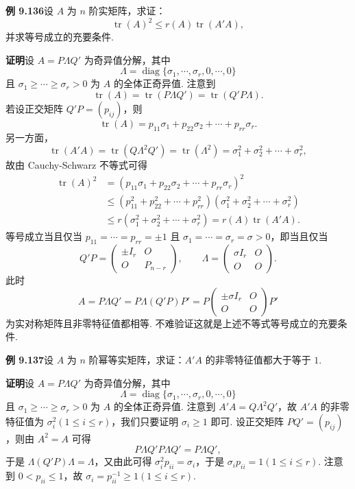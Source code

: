 \documentclass[UTF8,12pt,a4paper,fontset=fandol]{ctexart}
\begin{document}
\noindent\textbf{例 9.136}\quad 设 $A$ 为 $n$ 阶实矩阵，求证：
\[
\operatorname{tr}(A)^2\le r(A)\operatorname{tr}(A'A),
\]
并求等号成立的充要条件.

\noindent\textbf{证明}\quad 设 $A=P\Lambda Q'$ 为奇异值分解，其中
\[
\Lambda=\operatorname{diag}\{\sigma_1,\cdots,\sigma_r,0,\cdots,0\}
\]
且 $\sigma_1\ge\cdots\ge\sigma_r>0$ 为 $A$ 的全体正奇异值. 注意到
\[
\operatorname{tr}(A)=\operatorname{tr}(P\Lambda Q')=\operatorname{tr}(Q'P\Lambda).
\]
若设正交矩阵 $Q'P=(p_{ij})$，则
\[
\operatorname{tr}(A)=p_{11}\sigma_1+p_{22}\sigma_2+\cdots+p_{rr}\sigma_r.
\]
另一方面，
\[
\operatorname{tr}(A'A)=\operatorname{tr}(Q\Lambda^2Q')=\operatorname{tr}(\Lambda^2)=\sigma_1^2+\sigma_2^2+\cdots+\sigma_r^2,
\]
故由 Cauchy-Schwarz 不等式可得
\[
\begin{aligned}
\operatorname{tr}(A)^2
&=(p_{11}\sigma_1+p_{22}\sigma_2+\cdots+p_{rr}\sigma_r)^2\\
&\le(p_{11}^2+p_{22}^2+\cdots+p_{rr}^2)(\sigma_1^2+\sigma_2^2+\cdots+\sigma_r^2)\\
&\le r(\sigma_1^2+\sigma_2^2+\cdots+\sigma_r^2)=r(A)\operatorname{tr}(A'A).
\end{aligned}
\]
等号成立当且仅当 $p_{11}=\cdots=p_{rr}=\pm1$ 且 $\sigma_1=\cdots=\sigma_r=\sigma>0$，即当且仅当
\[
Q'P=\begin{pmatrix}
\pm I_r&O\\
O&P_{n-r}
\end{pmatrix},\qquad
\Lambda=\begin{pmatrix}
\sigma I_r&O\\
O&O
\end{pmatrix}.
\]
此时
\[
A=P\Lambda Q'=P\Lambda(Q'P)P'=P\begin{pmatrix}
\pm\sigma I_r&O\\
O&O
\end{pmatrix}P'
\]
为实对称矩阵且非零特征值都相等. 不难验证这就是上述不等式等号成立的充要条件.

\noindent\textbf{例 9.137}\quad 设 $A$ 为 $n$ 阶幂等实矩阵，求证：$A'A$ 的非零特征值都大于等于 $1$.

\noindent\textbf{证明}\quad 设 $A=P\Lambda Q'$ 为奇异值分解，其中
\[
\Lambda=\operatorname{diag}\{\sigma_1,\cdots,\sigma_r,0,\cdots,0\}
\]
且 $\sigma_1\ge\cdots\ge\sigma_r>0$ 为 $A$ 的全体正奇异值. 注意到 $A'A=Q\Lambda^2Q'$，故 $A'A$ 的非零特征值为 $\sigma_i^2(1\le i\le r)$，我们只要证明 $\sigma_i\ge1$ 即可. 设正交矩阵 $PQ'=(p_{ij})$，则由 $A^2=A$ 可得
\[
P\Lambda Q'P\Lambda Q'=P\Lambda Q',
\]
于是 $\Lambda(Q'P)\Lambda=\Lambda$，又由此可得 $\sigma_i^2p_{ii}=\sigma_i$，于是 $\sigma_ip_{ii}=1(1\le i\le r)$. 注意到 $0<p_{ii}\le1$，故 $\sigma_i=p_{ii}^{-1}\ge1(1\le i\le r)$.
\end{document}
